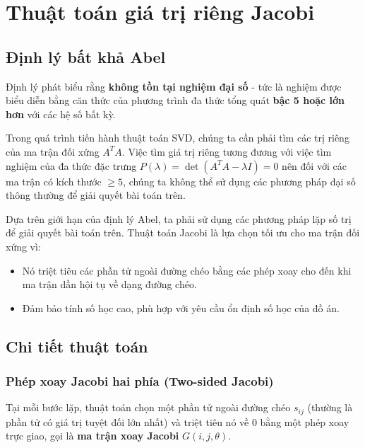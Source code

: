 \section{Thuật toán giá trị riêng Jacobi}

\subsection{Định lý bất khả Abel}

Định lý phát biểu rằng \textbf{không tồn tại nghiệm đại số} - tức là nghiệm được biểu diễn bằng căn thức của phương trình đa thức tổng quát \textbf{bậc 5 hoặc lớn hơn} với các hệ số bất kỳ.

Trong quá trình tiến hành thuật toán SVD, chúng ta cần phải tìm các trị riêng của ma trận đối xứng $A^TA$. Việc tìm giá trị riêng tương đương với việc tìm nghiệm của đa thức đặc trưng $P(\lambda) = \det(A^TA - \lambda I) = 0$ nên đối với các ma trận có kích thước $\geq 5$, chúng ta không thể sử dụng các phương pháp đại số thông thường để giải quyết bài toán trên.

Dựa trên giới hạn của định lý Abel, ta phải sử dụng các phương pháp lặp số trị để giải quyết bài toán trên. Thuật toán Jacobi là lựa chọn tối ưu cho ma trận đối xứng vì:

\begin{itemize}[topsep=0pt, itemsep=2.5pt, leftmargin=1.5cm]
    \item Nó triệt tiêu các phần tử ngoài đường chéo bằng các phép xoay cho đến khi ma trận dần hội tụ về dạng đường chéo.
    \item Đảm bảo tính số học cao, phù hợp với yêu cầu ổn định số học của đồ án.
\end{itemize}

\newpage

\subsection{Chi tiết thuật toán}

\subsubsection{Phép xoay Jacobi hai phía (Two-sided Jacobi)\protect\footnotemark}

Tại mỗi bước lặp, thuật toán chọn một phần tử ngoài đường chéo $s_{ij}$ (thường là phần tử có giá trị tuyệt đối lớn nhất) và triệt tiêu nó về 0 bằng một phép xoay trực giao, gọi là \textbf{ma trận xoay Jacobi} $G(i, j, \theta)$.

